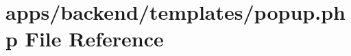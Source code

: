 \hypertarget{popup_8php}{\section{apps/backend/templates/popup.php File Reference}
\label{popup_8php}
}
